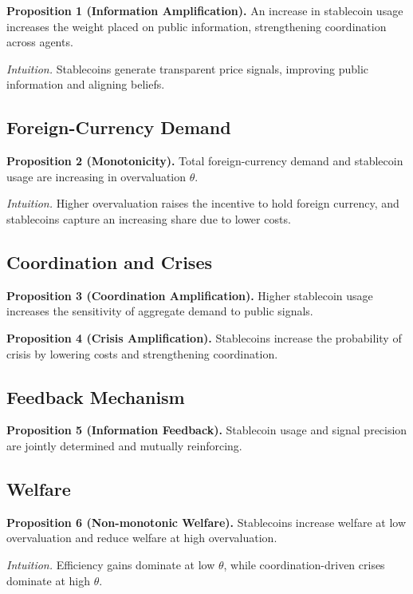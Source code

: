 \textbf{Proposition 1 (Information Amplification).} An increase in stablecoin usage increases the weight placed on public information, strengthening coordination across agents.

\textit{Intuition.} Stablecoins generate transparent price signals, improving public information and aligning beliefs.

\subsection{Foreign-Currency Demand}

\textbf{Proposition 2 (Monotonicity).} Total foreign-currency demand and stablecoin usage are increasing in overvaluation $\theta$.

\textit{Intuition.} Higher overvaluation raises the incentive to hold foreign currency, and stablecoins capture an increasing share due to lower costs.

\subsection{Coordination and Crises}

\textbf{Proposition 3 (Coordination Amplification).} Higher stablecoin usage increases the sensitivity of aggregate demand to public signals.

\textbf{Proposition 4 (Crisis Amplification).} Stablecoins increase the probability of crisis by lowering costs and strengthening coordination.

\subsection{Feedback Mechanism}

\textbf{Proposition 5 (Information Feedback).} Stablecoin usage and signal precision are jointly determined and mutually reinforcing.

\subsection{Welfare}

\textbf{Proposition 6 (Non-monotonic Welfare).} Stablecoins increase welfare at low overvaluation and reduce welfare at high overvaluation.

\textit{Intuition.} Efficiency gains dominate at low $\theta$, while coordination-driven crises dominate at high $\theta$.
